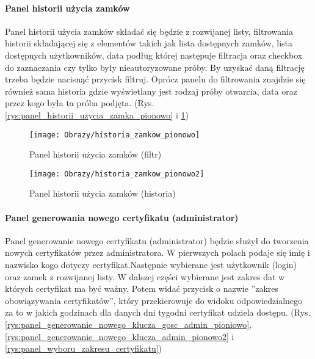 	\paragraph*{Panel historii użycia zamków}
	Panel historii użycia zamków składać się będzie z rozwijanej listy, filtrowania historii składającej się z elementów takich jak lista dostępnych zamków, lista dostępnych użytkowników, data podług której następuje filtracja oraz checkbox do zaznaczania czy tylko były nieautoryzowane próby. By uzyskać daną filtrację trzeba będzie nacisnąć przycisk filtruj. Oprócz panelu do filtrowania znajdzie się również sama historia gdzie wyświetlany jest rodzaj próby otwarcia, data oraz przez kogo była ta próba podjęta. (Rys. \ref{rys:panel_historii_uzycia_zamka_pionowo} i \ref{rys:panel_historii_uzycia_zamka_pionowo2})
	
	\begin{figure}[ht!]
		\begin{minipage}{0.45\textwidth}
			\texttt{[image: Obrazy/historia\_zamkow\_pionowo]}
			\caption{Panel historii użycia zamków (filtr)}
			\label{rys:panel_historii_uzycia_zamka_pionowo}
		\end{minipage}
	\hspace{0.1\textwidth}
		\begin{minipage}{0.45\textwidth}
			\texttt{[image: Obrazy/historia\_zamkow\_pionowo2]}
			\caption{Panel historii użycia zamków (historia)}
			\label{rys:panel_historii_uzycia_zamka_pionowo2}	
		\end{minipage}
	\end{figure}
	\newpage
	
	\paragraph*{Panel generowania nowego certyfikatu (administrator)}
	Panel generowanie nowego certyfikatu (administrator) będzie służył do tworzenia nowych certyfikatów przez administratora. W pierwszych polach podaje się imię i nazwisko kogo dotyczy certyfikat.Następnie wybierane jest użytkownik (login) oraz zamek z rozwijanej listy. W dalszej części wybierane jest zakres dat w których certyfikat ma być ważny. Potem widać przycisk o nazwie ''zakres obowiązywania certyfikatów'', który przekierowuje do widoku odpowiedzialnego za to w jakich godzinach dla danych dni tygodni certyfikat udziela dostępu. (Rys. \ref{rys:panel_generowanie_nowego_klucza_gosc_admin_pioniowo}, \ref{rys:panel_generowanie_nowego_klucza_admin_pionowo2} i 
	\ref{rys:panel_wyboru_zakresu_certyfikatu})
	

